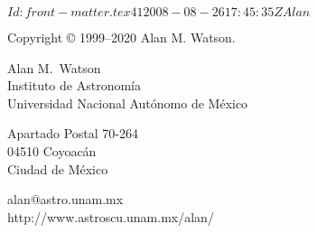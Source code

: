 
\svnInfo $Id: front-matter.tex 41 2008-08-26 17:45:35Z Alan $

\noindent
Copyright {\copyright} 1999--2020 Alan M. Watson.


\bigskip
\bigskip

\noindent
Alan M.\ Watson\\
Instituto de Astronomía\\
Universidad Nacional Autónomo de México

\medskip
\noindent
Apartado Postal 70-264\\
04510 Coyoacán\\
Ciudad de México

\medskip
\noindent
alan@astro.unam.mx\\
http://www.astroscu.unam.mx/\raisebox{-3pt}{\~\relax}alan/

\bigskip
\bigskip






